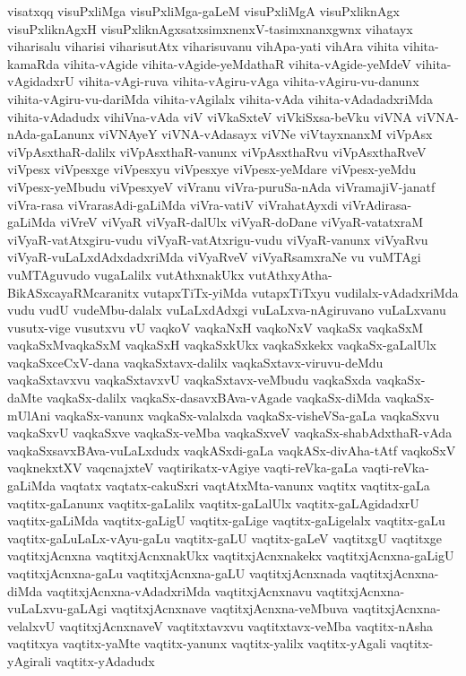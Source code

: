 {visatxqq
visuPxliMga
visuPxliMga-gaLeM
visuPxliMgA
visuPxliknAgx
visuPxliknAgxH
visuPxliknAgxsatxsimxnenxV-tasimxnanxgwnx
vihatayx
viharisalu
viharisi
viharisutAtx
viharisuvanu
vihApa-yati
vihAra
vihita
vihita-kamaRda
vihita-vAgide
vihita-vAgide-yeMdathaR
vihita-vAgide-yeMdeV
vihita-vAgidadxrU
vihita-vAgi-ruva
vihita-vAgiru-vAga
vihita-vAgiru-vu-danunx
vihita-vAgiru-vu-dariMda
vihita-vAgilalx
vihita-vAda
vihita-vAdadadxriMda
vihita-vAdadudx
vihiVna-vAda
viV
viVkaSxteV
viVkiSxsa-beVku
viVNA
viVNA-nAda-gaLanunx
viVNAyeY
viVNA-vAdasayx
viVNe
viVtayxnanxM
viVpAsx
viVpAsxthaR-dalilx
viVpAsxthaR-vanunx
viVpAsxthaRvu
viVpAsxthaRveV
viVpesx
viVpesxge
viVpesxyu
viVpesxye
viVpesx-yeMdare
viVpesx-yeMdu
viVpesx-yeMbudu
viVpesxyeV
viVranu
viVra-puruSa-nAda
viVramajiV-janatf
viVra-rasa
viVrarasAdi-gaLiMda
viVra-vatiV
viVrahatAyxdi
viVrAdirasa-gaLiMda
viVreV
viVyaR
viVyaR-dalUlx
viVyaR-doDane
viVyaR-vatatxraM
viVyaR-vatAtxgiru-vudu
viVyaR-vatAtxrigu-vudu
viVyaR-vanunx
viVyaRvu
viVyaR-vuLaLxdAdxdadxriMda
viVyaRveV
viVyaRsamxraNe
vu
vuMTAgi
vuMTAguvudo
vugaLalilx
vutAthxnakUkx
vutAthxyAtha-BikASxcayaRMcaranitx
vutapxTiTx-yiMda
vutapxTiTxyu
vudilalx-vAdadxriMda
vudu
vudU
vudeMbu-dalalx
vuLaLxdAdxgi
vuLaLxva-nAgiruvano
vuLaLxvanu
vusutx-vige
vusutxvu
vU
vaqkoV
vaqkaNxH
vaqkoNxV
vaqkaSx
vaqkaSxM
vaqkaSxMvaqkaSxM
vaqkaSxH
vaqkaSxkUkx
vaqkaSxkekx
vaqkaSx-gaLalUlx
vaqkaSxceCxV-dana
vaqkaSxtavx-dalilx
vaqkaSxtavx-viruvu-deMdu
vaqkaSxtavxvu
vaqkaSxtavxvU
vaqkaSxtavx-veMbudu
vaqkaSxda
vaqkaSx-daMte
vaqkaSx-dalilx
vaqkaSx-dasavxBAva-vAgade
vaqkaSx-diMda
vaqkaSx-mUlAni
vaqkaSx-vanunx
vaqkaSx-valalxda
vaqkaSx-visheVSa-gaLa
vaqkaSxvu
vaqkaSxvU
vaqkaSxve
vaqkaSx-veMba
vaqkaSxveV
vaqkaSx-shabAdxthaR-vAda
vaqkaSxsavxBAva-vuLaLxdudx
vaqkASxdi-gaLa
vaqkASx-divAha-tAtf
vaqkoSxV
vaqknekxtXV
vaqcnajxteV
vaqtirikatx-vAgiye
vaqti-reVka-gaLa
vaqti-reVka-gaLiMda
vaqtatx
vaqtatx-cakuSxri
vaqtAtxMta-vanunx
vaqtitx
vaqtitx-gaLa
vaqtitx-gaLanunx
vaqtitx-gaLalilx
vaqtitx-gaLalUlx
vaqtitx-gaLAgidadxrU
vaqtitx-gaLiMda
vaqtitx-gaLigU
vaqtitx-gaLige
vaqtitx-gaLigelalx
vaqtitx-gaLu
vaqtitx-gaLuLaLx-vAyu-gaLu
vaqtitx-gaLU
vaqtitx-gaLeV
vaqtitxgU
vaqtitxge
vaqtitxjAcnxna
vaqtitxjAcnxnakUkx
vaqtitxjAcnxnakekx
vaqtitxjAcnxna-gaLigU
vaqtitxjAcnxna-gaLu
vaqtitxjAcnxna-gaLU
vaqtitxjAcnxnada
vaqtitxjAcnxna-diMda
vaqtitxjAcnxna-vAdadxriMda
vaqtitxjAcnxnavu
vaqtitxjAcnxna-vuLaLxvu-gaLAgi
vaqtitxjAcnxnave
vaqtitxjAcnxna-veMbuva
vaqtitxjAcnxna-velalxvU
vaqtitxjAcnxnaveV
vaqtitxtavxvu
vaqtitxtavx-veMba
vaqtitx-nAsha
vaqtitxya
vaqtitx-yaMte
vaqtitx-yanunx
vaqtitx-yalilx
vaqtitx-yAgali
vaqtitx-yAgirali
vaqtitx-yAdadudx
}
